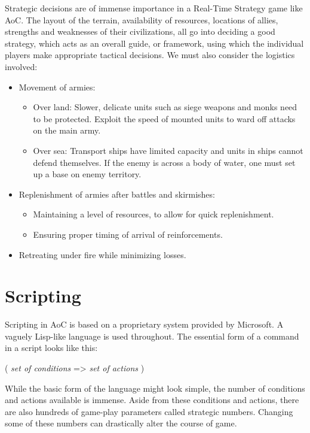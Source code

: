\documentclass[a4paper,12pt]{article}
\begin{document}
Strategic decisions are of immense importance in a Real-Time Strategy game 
like AoC. The layout of the terrain, availability of resources, locations 
of allies, strengths and weaknesses of their civilizations, all go into 
deciding a good strategy, which acts as an overall guide, or framework,  
using which the individual players make appropriate tactical decisions.
We must also consider the logistics involved: 
\begin{itemize}
	\item Movement of armies:
	\begin{itemize}
		\item Over land:	Slower, delicate units such as siege weapons and 
		monks need to be protected. Exploit the speed of mounted units to 
		ward off attacks on the main army.
		\item Over sea:	Transport ships have limited capacity and units 
		in ships cannot defend themselves. If the enemy is across a body 
		of water, one must set up a base on enemy territory. 
	\end{itemize}
	\item Replenishment of armies after battles and skirmishes:
	\begin{itemize}
		\item Maintaining a level of resources, to allow for 
		quick replenishment.
		\item Ensuring proper timing of arrival of reinforcements.
	\end{itemize}
	\item Retreating under fire while minimizing losses.
\end{itemize}

\section*{Scripting}
Scripting in AoC is based on a proprietary system provided by Microsoft. 
A vaguely Lisp-like language is used throughout. The essential form of a 
command in a script looks like this:
\begin{program}
( 
	\emph{set of conditions} =>	\emph{set of actions}
)
\end{program}
While the basic form of the language might look simple, the number of 
conditions and actions available is immense. Aside from these conditions 
and actions, there are also hundreds of game-play parameters called 
strategic numbers. Changing some of these numbers can drastically alter 
the course of game.
\end{document}
